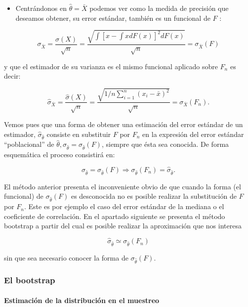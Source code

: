 \documentclass[
]{article}
\providecommand{\tightlist}{%
  \setlength{\itemsep}{0pt}\setlength{\parskip}{0pt}}
\begin{document}
\begin{itemize}
\tightlist
\item
  Centrándonos en \(\hat{\theta}=\bar{X}\) podemos ver como la medida de precisión que deseamos obtener, su error estándar, también es un funcional de \(F\) :
\end{itemize}

\[
\sigma_{\bar{X}}=\frac{\sigma(X)}{\sqrt{n}}=\frac{\sqrt{\int\left[x-\int x d F(x)\right]^{2} d F(x)}}{\sqrt{n}}=\sigma_{\bar{X}}(F)
\]

y que el estimador de su varianza es el mismo funcional aplicado sobre \(F_{n}\) es decir:

\[
\hat{\sigma}_{\bar{X}}=\frac{\hat{\sigma}(X)}{\sqrt{n}}=\frac{\sqrt{1 / n \sum_{i=1}^{n}\left(x_{i}-\bar{x}\right)^{2}}}{\sqrt{n}}=\sigma_{\bar{X}}\left(F_{n}\right) .
\]

Vemos pues que una forma de obtener una estimación del error estándar de un estimador, \(\hat{\sigma}_{\hat{\theta}}\) consiste en substituir \(F\) por \(F_{n}\) en la expresión del error estándar ``poblacional'' de \(\hat{\theta}, \sigma_{\hat{\theta}}=\sigma_{\hat{\theta}}(F)\), siempre que ésta sea conocida. De forma esquemática el proceso consistirá en:

\[
\sigma_{\hat{\theta}}=\sigma_{\hat{\theta}}(F) \Longrightarrow \sigma_{\hat{\theta}}\left(F_{n}\right)=\widehat{\sigma}_{\hat{\theta}} .
\]

El método anterior presenta el inconveniente obvio de que cuando la forma (el funcional) de \(\sigma_{\hat{\theta}}(F)\) es desconocida no es posible realizar la substitución de \(F\) por \(F_{n}\). Este es por ejemplo el caso del error estándar de la mediana o el coeficiente de correlación. En el apartado siguiente se presenta el método bootstrap a partir del cual es posible realizar la aproximación que nos interesa

\[
\hat{\sigma}_{\hat{\theta}} \simeq \sigma_{\hat{\theta}}\left(F_{n}\right)
\]

sin que sea necesario conocer la forma de \(\sigma_{\hat{\theta}}(F)\).

\subsubsection{El bootstrap}\label{el-bootstrap}

\paragraph{Estimación de la distribución en el muestreo}\label{estimaciuxf3n-de-la-distribuciuxf3n-en-el-muestreo}
\end{document}
